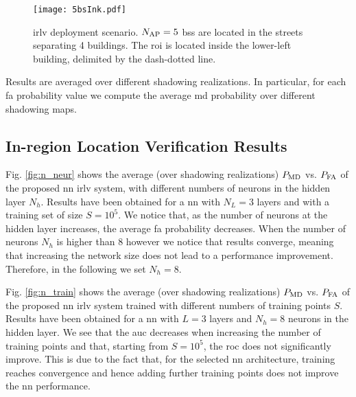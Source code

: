\documentclass[conference,final]{IEEEtran}
\begin{document}
 \begin{figure}[h]
     \centering
     \texttt{[image: 5bsInk.pdf]}
     \caption{\ac{irlv} deployment scenario. $N_{\rm AP}=5$ \acp{bs} are located in the streets separating 4 buildings. The \ac{roi} is located inside the lower-left building, delimited by the dash-dotted line.}
     \label{fig:5bs}
 \end{figure}
 
Results are averaged over different shadowing realizations. In particular, for each \ac{fa} probability value we compute the average \ac{md} probability over different shadowing maps.


\subsection{In-region Location Verification Results}

Fig. \ref{fig:n_neur} shows the average (over shadowing realizations) $P_{\rm MD}$ vs. $P_{\rm FA}$ of the proposed \ac{nn} \ac{irlv} system,  with different numbers of neurons in the hidden layer $N_h$. Results have been obtained for a \ac{nn} with $N_L=3$ layers and with a training set of size $S= 10^5$. We notice that, as the number of neurons at the hidden layer increases, the average \ac{fa} probability decreases. When the number of neurons $N_h$ is higher than $8$ however we notice that results converge, meaning that increasing the network size does not lead to a performance improvement. Therefore, in the following we set $N_h=8$.

Fig. \ref{fig:n_train} shows the average (over shadowing realizations) $P_{\rm MD}$ vs. $P_{\rm FA}$ of the proposed \ac{nn} \ac{irlv} system  trained with different numbers of training points $S$. Results have been obtained for a \ac{nn} with  $L=3$ layers and $N_h=8$ neurons in the hidden layer. We see that the \ac{auc} decreases when increasing the number of training points and that, starting from $S=10^5$, the \ac{roc} does not significantly improve. This is due to the fact that, for the selected \ac{nn} architecture, training reaches convergence and hence adding further  training points does not improve the \ac{nn} performance. 
\end{document}
